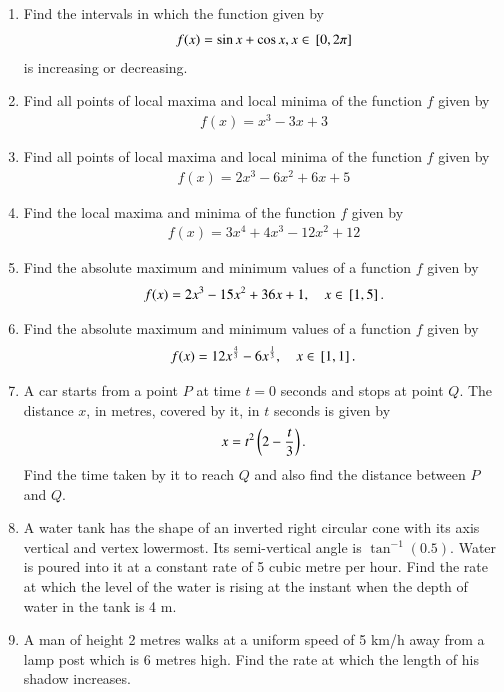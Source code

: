 \begin{enumerate}[label=\arabic*.,ref=\thesubsection.\theenumi]
%
\item Find the intervals in which the function given by 
\begin{align}
f(x)  = \sin x + \cos x, x \in {}\left[0,2\pi\right]
\end{align}
%
is increasing or decreasing.
%
\item Find all points of local maxima and local minima of the function $f$ given by 
%
\begin{align}
f(x)  = x^3-3x+3
\end{align}
%
\item Find all points of local maxima and local minima of the function $f$ given by 
%
\begin{align}
f(x)  = 2x^3-6x^2+6x+5
\end{align}
%
\item Find the local maxima and minima of the function $f$ given by 
%
\begin{align}
f(x)  = 3x^4+4x^3-12x^2+12
\end{align}
%
\item Find the absolute maximum and minimum values of a function $f$ given by
%
\begin{align}
f(x)  = 2x^3-15x^2+36x+1, \quad x \in {}\left[1,5\right].
\end{align}
%
\item Find the absolute maximum and minimum values of a function $f$ given by
%
\begin{align}
f(x)  = 12x^\frac{4}{3}-6x^{\frac{1}{3}}, \quad x \in {}\left[1,1\right].
\end{align}
%
\item A car starts from a point $P$ at time $t=0$ seconds and stops at point $Q$.  The distance $x$, in metres, covered by it, in $t$ seconds is given by 
%
\begin{align}
x = t^2\left(2-\frac{t}{3}\right).
\end{align}
%
Find the time taken by it to reach $Q$ and also find the distance between $P$ and $Q$.
\item A water tank has the shape of an inverted right circular cone with its axis vertical and vertex lowermost.  Its semi-vertical angle is $\tan ^{-1}(0.5)$. Water is poured
into it at a constant rate of 5 cubic metre per hour. Find the rate at which the level of the water is rising at the instant when the depth of water in the tank is 4 m.%
\item  A man of height 2 metres walks at a uniform speed of 5 km/h away from a lamp post which is 6 metres high. Find the rate at which the length of his shadow increases.

\end{enumerate}
